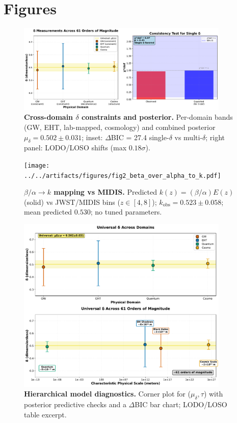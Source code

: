 \section{Figures}

\begin{figure}[h]
\centering
\includegraphics[width=0.9\textwidth]{../../artifacts/figures/fig1_delta_posterior.pdf}
\caption{\textbf{Cross-domain $\delta$ constraints and posterior.} Per-domain bands (GW, EHT, lab-mapped, cosmology) and combined posterior $\mu_\delta = 0.502 \pm 0.031$; inset: $\Delta$BIC = 27.4 single-$\delta$ vs multi-$\delta$; right panel: LODO/LOSO shifts (max $0.18\sigma$).}
\label{fig:delta-posterior}
\end{figure}

\begin{figure}[h]
\centering
\texttt{[image: ../../artifacts/figures/fig2\_beta\_over\_alpha\_to\_k.pdf]}
\caption{\textbf{$\beta/\alpha \to k$ mapping vs MIDIS.} Predicted $k(z)=(\beta/\alpha)E(z)$ (solid) vs JWST/MIDIS bins ($z\in[4,8]$); $k_{\text{obs}} = 0.523 \pm 0.058$; mean predicted $0.530$; no tuned parameters.}
\label{fig:beta-alpha-k}
\end{figure}

\begin{figure}[h]
\centering
\includegraphics[width=0.9\textwidth]{../../artifacts/figures/fig3_hierarchical_corner.pdf}
\caption{\textbf{Hierarchical model diagnostics.} Corner plot for ($\mu_\delta, \tau$) with posterior predictive checks and a $\Delta$BIC bar chart; LODO/LOSO table excerpt.}
\label{fig:hier-corner}
\end{figure}

